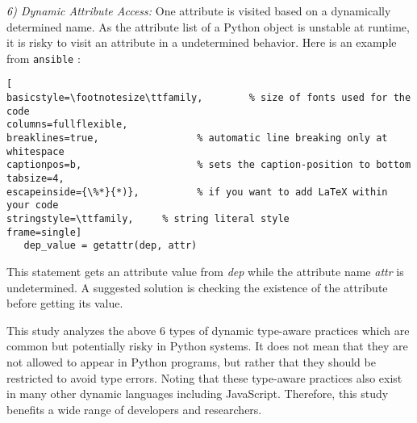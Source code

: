 \emph{6) Dynamic Attribute Access:} One attribute is visited based on a dynamically determined name. As the attribute list of a Python object is unstable at runtime, it is risky to visit an attribute in a undetermined behavior. Here is an example from {\tt ansible}\cite{b40} :

 \begin{lstlisting}[
basicstyle=\footnotesize\ttfamily,        % size of fonts used for the code
columns=fullflexible,
breaklines=true,                 % automatic line breaking only at whitespace
captionpos=b,                    % sets the caption-position to bottom
tabsize=4,
escapeinside={\%*}{*)},          % if you want to add LaTeX within your code
stringstyle=\ttfamily,     % string literal style
frame=single]
   dep_value = getattr(dep, attr)
\end{lstlisting}
\noindent This statement gets an attribute value from \emph{dep} while the attribute name \emph{attr} is undetermined. A suggested solution is checking the existence of the attribute before getting its value.

This study analyzes the above 6 types of dynamic type-aware practices which are common but potentially risky in Python systems. It does not mean that they are not allowed to appear in Python programs, but rather that they should be restricted to avoid type errors. Noting that these type-aware practices also exist in many other dynamic languages including JavaScript. Therefore, this study benefits a wide range of developers and researchers. 


